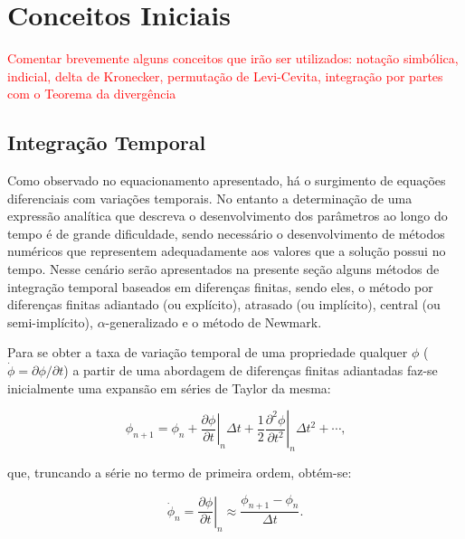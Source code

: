 \documentclass[_ArquivoPrincipal.tex]{subfiles}
\begin{document}
\section{Conceitos Iniciais} \label{CI}

\textcolor{red}{Comentar brevemente alguns conceitos que irão ser utilizados: notação simbólica, indicial, delta de Kronecker, permutação de Levi-Cevita, integração por partes com o Teorema da divergência}

\subsection{Integração Temporal} \label{MEFP-IntTemp}

Como observado no equacionamento apresentado, há o surgimento de equações diferenciais com variações temporais. No entanto a determinação de uma expressão analítica que descreva o desenvolvimento dos parâmetros ao longo do tempo é de grande dificuldade, sendo necessário o desenvolvimento de métodos numéricos que representem adequadamente aos valores que a solução possui no tempo. Nesse cenário serão apresentados na presente seção alguns métodos de integração temporal baseados em diferenças finitas, sendo eles, o método por diferenças finitas adiantado (ou explícito), atrasado (ou implícito), central (ou semi-implícito), $\alpha$-generalizado e o método de Newmark.

Para se obter a taxa de variação temporal de uma propriedade qualquer $\phi$ ($\dot{\phi}=\partial\phi/\partial t$) a partir de uma abordagem de diferenças finitas adiantadas faz-se inicialmente uma expansão em séries de Taylor da mesma:

\begin{equation}
    \phi_{n+1}=\phi_n+\left.\frac{\partial\phi}{\partial t}\right|_n\Delta t+\frac{1}{2}\left.\frac{\partial^2\phi}{\partial t^2}\right|_n\Delta t^2+\cdots\text{,}\label{eq:TaylorAd}
\end{equation}

\noindent que, truncando a série no termo de primeira ordem, obtém-se:

\begin{equation}
    \dot{\phi}_n=\left.\frac{\partial\phi}{\partial t}\right|_n\approx\frac{\phi_{n+1}-\phi_n}{\Delta t}\text{.}
\end{equation}
\end{document}
